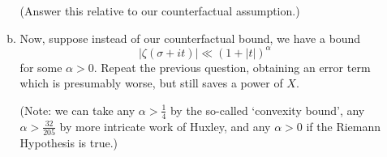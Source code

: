 \documentclass[12pt]{article}
\begin{document}
\begin{enumerate}[(1)]
\begin{enumerate}[(a)]
(Answer this relative to our counterfactual assumption.)
\item
Now, suppose instead of our counterfactual bound, we have a bound
\[
|\zeta(\sigma + it)| \ll (1 + |t|)^{\alpha}
\]
for some $\alpha > 0$. Repeat the previous question, obtaining an error term which is presumably worse, but still saves a power of $X$.

(Note: we can take any $\alpha > \frac{1}{4}$ by the so-called `convexity bound', any $\alpha > \frac{32}{205}$ by more intricate
work of Huxley, and any $\alpha > 0$ if the Riemann Hypothesis is true.)

\end{enumerate}

\end{enumerate}
\end{document}
